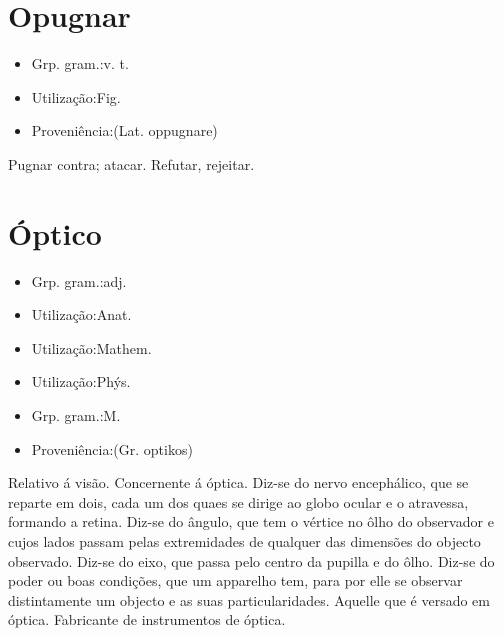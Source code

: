 \section{Opugnar}
\begin{itemize}
\item {Grp. gram.:v. t.}
\end{itemize}
\begin{itemize}
\item {Utilização:Fig.}
\end{itemize}
\begin{itemize}
\item {Proveniência:(Lat. \textunderscore oppugnare\textunderscore )}
\end{itemize}
Pugnar contra; atacar.
Refutar, rejeitar.
\section{Óptico}
\begin{itemize}
\item {Grp. gram.:adj.}
\end{itemize}
\begin{itemize}
\item {Utilização:Anat.}
\end{itemize}
\begin{itemize}
\item {Utilização:Mathem.}
\end{itemize}
\begin{itemize}
\item {Utilização:Phýs.}
\end{itemize}
\begin{itemize}
\item {Grp. gram.:M.}
\end{itemize}
\begin{itemize}
\item {Proveniência:(Gr. \textunderscore optikos\textunderscore )}
\end{itemize}
Relativo á visão.
Concernente á óptica.
Diz-se do nervo encephálico, que se reparte em dois, cada um dos quaes se dirige ao globo ocular e o atravessa, formando a retina.
Diz-se do ângulo, que tem o vértice no ôlho do observador e cujos lados passam pelas extremidades de qualquer das dimensões do objecto observado.
Diz-se do eixo, que passa pelo centro da pupilla e do ôlho.
Diz-se do poder ou boas condições, que um apparelho tem, para por elle se observar distintamente um objecto e as suas particularidades.
Aquelle que é versado em óptica.
Fabricante de instrumentos de óptica.
